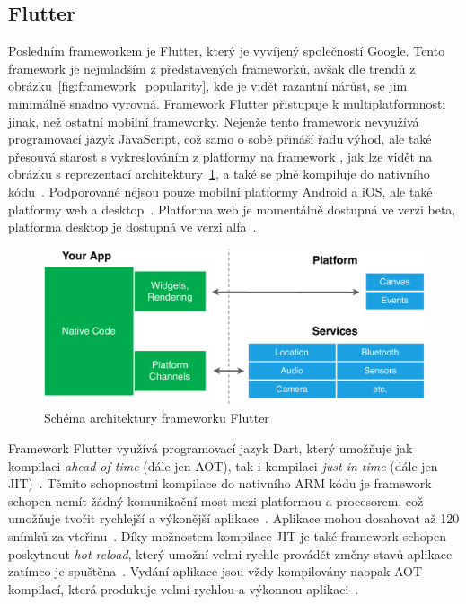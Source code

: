 \subsection{Flutter}

Posledním frameworkem je Flutter,
který je vyvíjený společností Google.
Tento framework je nejmladším z představených frameworků,
avšak dle trendů z obrázku~\ref{fig:framework_popularity},
kde je vidět razantní nárůst,
se jim minimálně snadno vyrovná.
Framework Flutter přistupuje k multiplatformnosti jinak,
než ostatní mobilní frameworky.
Nejenže tento framework nevyužívá programovací jazyk JavaScript,
což samo o sobě přináší řadu výhod,
ale také přesouvá starost s vykreslováním z platformy na framework
\cite{hackernoon_flutter},
jak lze vidět na obrázku s reprezentací
architektury~\ref{fig:framework_flutter},
a také se plně kompiluje do nativního
kódu~\cite{dashmagazine_mobile_frameworks}.
Podporované nejsou pouze mobilní platformy Android a iOS,
ale také platformy web a desktop~\cite{flutter}.
Platforma web je momentálně dostupná ve verzi beta,
platforma desktop je dostupná ve verzi alfa~\cite{flutter_web, flutter_desktop}.

\begin{figure}[ht!]
    \centering
    \includegraphics[width=\linewidth]{assets/technology-research/framework/flutter.pdf}
    \caption{Schéma architektury frameworku Flutter~\cite{hackernoon_flutter}}
    \label{fig:framework_flutter}
\end{figure}

Framework Flutter využívá programovací jazyk Dart,
který umožňuje jak kompilaci \emph{ahead of time} (dále jen AOT),
tak i kompilaci \emph{just in time} (dále jen JIT)~\cite{hackernoon_flutter}.
Těmito schopnostmi kompilace do nativního ARM kódu je framework schopen
nemít žádný komunikační most mezi platformou a procesorem,
což umožňuje tvořit rychlejší
a výkonější aplikace~\cite{dashmagazine_mobile_frameworks}.
Aplikace mohou dosahovat až 120 snímků
za vteřinu~\cite{dashmagazine_mobile_frameworks}.
Díky možnostem kompilace JIT je také framework schopen poskytnout
\emph{hot reload},
který umožní velmi rychle provádět změny stavů aplikace zatímco
je spuštěna~\cite{hackernoon_flutter}.
Vydání aplikace jsou vždy kompilovány naopak AOT kompilací,
která produkuje velmi rychlou a výkonnou aplikaci~\cite{hackernoon_flutter}.

